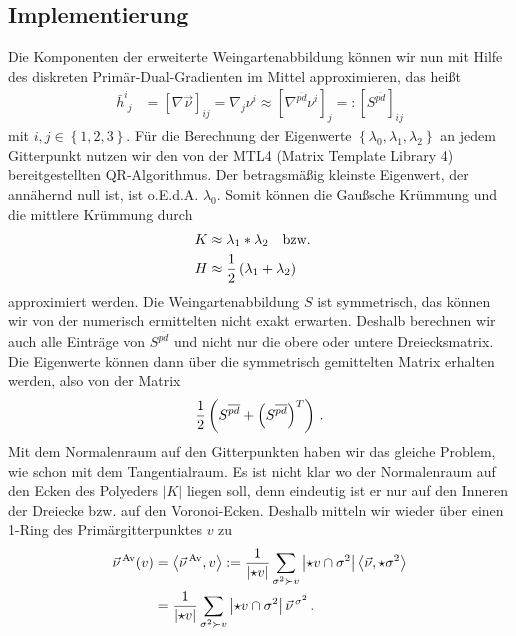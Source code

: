   \subsection{Implementierung}
    Die Komponenten der erweiterte Weingartenabbildung können wir nun mit Hilfe des diskreten Primär-Dual-Gradienten im Mittel approximieren, das heißt
    \begin{align}
      \bar{h}^{i}_{\phantom{i}j} &= \left[ \nabla\vec{\nu} \right]_{ij} = \nabla_{j}\nu^{i}
                                 \approx \left[ \nabla^{\overline{pd}}\nu^{i} \right]_{j}
                                 =: \left[ S^{\overline{pd}} \right]_{ij}
    \end{align}
    mit \( i,j \in \left\{ 1,2,3 \right\} \).
    Für die Berechnung der Eigenwerte \( \left\{ \lambda_{0}, \lambda_{1}, \lambda_{2} \right\} \) an jedem Gitterpunkt 
    nutzen wir den von der MTL4 (Matrix Template Library 4) bereitgestellten QR-Algorithmus.
    Der betragsmäßig kleinste Eigenwert, der annähernd null ist, ist o.E.d.A. \( \lambda_{0} \).
    Somit können die Gaußsche Krümmung und die mittlere Krümmung durch
    \begin{align}
      K &\approx \lambda_{1}*\lambda_{2} \quad\text{bzw.}\quad \\
      H &\approx \frac{1}{2}\left( \lambda_{1}+\lambda_{2}\right)    
    \end{align}
    approximiert werden.
    Die Weingartenabbildung \( S \) ist symmetrisch, das können wir von der numerisch ermittelten nicht exakt erwarten.
    Deshalb berechnen wir auch alle Einträge von \( S^{\overline{pd}} \) und nicht nur die obere oder
    untere Dreiecksmatrix. 
    Die Eigenwerte können dann über die symmetrisch gemittelten Matrix erhalten werden, also von der Matrix
    \begin{align}
      \frac{1}{2} \left( S^{\overline{pd}} + \left( S^{\overline{pd}} \right)^{T} \right) \,\text{.}
    \end{align}
    Mit dem Normalenraum auf den Gitterpunkten haben wir das gleiche Problem, wie schon mit dem Tangentialraum.
    Es ist nicht klar wo der Normalenraum auf den Ecken des Polyeders \( |K| \) liegen soll, denn eindeutig ist er nur auf den Inneren der Dreiecke
    bzw. auf den Voronoi-Ecken.
    Deshalb mitteln wir wieder über einen 1-Ring des Primärgitterpunktes \( v \) zu
    \begin{align}
    \label{eqNormalMittel}
    \begin{aligned}
      \vec{\nu}^{\,\text{Av}}(v) &= \left\langle \vec{\nu}^{\,\text{Av}}, v \right\rangle 
          := \frac{1}{\left| \star v \right|} \sum_{\sigma^{2}\succ v} \left| \star v \cap \sigma^{2}\right| 
                      \left\langle \vec{\nu}, \star\sigma^{2} \right\rangle \\
          &= \frac{1}{\left| \star v \right|} \sum_{\sigma^{2}\succ v} \left| \star v \cap \sigma^{2}\right| 
                                          \vec{\nu}^{\,\sigma^{2}} \,\text{.}
    \end{aligned}
    \end{align}
